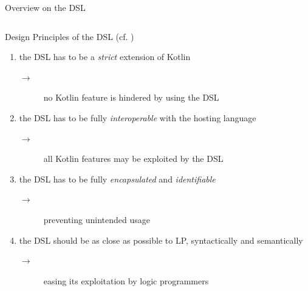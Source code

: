 \documentclass[handout]{beamer}
\begin{document}
\begin{frame}[allowframebreaks]{Overview on the DSL}
    \framebreak

    \begin{columns}
        \centering
        \begin{column}{.48\linewidth}
        \end{column}
        \hfill
        \begin{column}{.48\linewidth}
        \end{column}
    \end{columns}

\end{frame}

\begin{frame}[allowframebreaks]{Design Principles of the DSL (cf. )}  
    \begin{enumerate}
        \item the DSL has to be a \textit{strict} extension of Kotlin
        \begin{description}
            \item [$\rightarrow$] no Kotlin feature is hindered by using the DSL
        \end{description}
        \vfill
        \item the DSL has to be fully \textit{interoperable} with the hosting language
        \begin{description}
            \item [$\rightarrow$] all Kotlin features may be exploited by the DSL
        \end{description}
        \vfill
        \item the DSL has to be fully \textit{encapsulated} and \textit{identifiable}
        \begin{description}
            \item [$\rightarrow$] preventing unintended usage
        \end{description}
        \vfill
        \item the DSL should be as close as possible to LP, syntactically and semantically
        \begin{description}
            \item [$\rightarrow$] easing its exploitation by logic programmers
        \end{description}
    \end{enumerate}
\end{frame}
\end{document}
